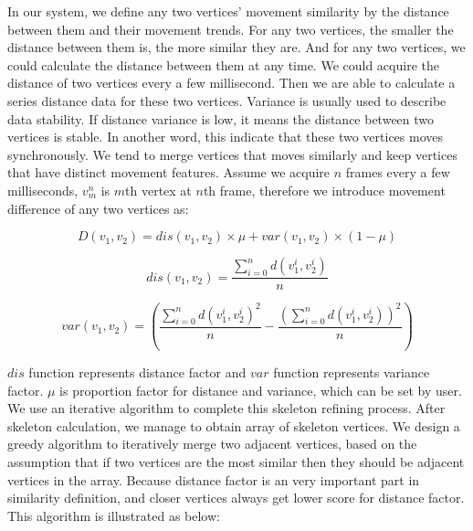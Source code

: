 \documentclass[10pt,journal,compsoc]{IEEEtran}
\begin{document}
In our system, we define any two vertices' movement similarity by the distance between them and their movement trends. For any two vertices, the smaller the distance between them is, the more similar they are. And for any two vertices, we could calculate the distance between them at any time. We could acquire the distance of two vertices every a few millisecond. Then we are able to calculate a series distance data for these two vertices. Variance is usually used to describe data stability. If distance variance is low, it means the distance between two vertices is stable. In another word, this indicate that these two vertices moves synchronously. We tend to merge vertices that moves similarly and keep vertices that have distinct movement features. Assume we acquire $n$ frames every a few milliseconds, $v_{m}^{n}$ is $m$th vertex at $n$th frame, therefore we introduce movement difference of any two vertices as:

\begin{equation}
D(v_{1}, v_{2}) = dis(v_{1}, v_{2})\times \mu + var(v_{1}, v_{2}) \times (1-\mu)
\label{eq:similarityeq}
\end{equation}

\begin{equation}
dis(v_{1}, v_{2}) = \dfrac{\sum_{i = 0}^{n}{d(v_{1}^{i}, v_{2}^{i})}}{n}
\label{eq:distance}
\end{equation}

\begin{equation}
var(v_{1}, v_{2}) = (\dfrac{\sum_{i = 0}^{n}{d(v_{1}^{i}, v_{2}^{i})}^{2}}{n} - \dfrac{(\sum_{i = 0}^{n}{d(v_{1}^{i}, v_{2}^{i})})^{2}}{n})
\label{eq:variance}
\end{equation}

$dis$ function represents distance factor and $var$ function represents variance factor. $\mu$ is proportion factor for distance and variance, which can be set by user.\\

We use an iterative algorithm to complete this skeleton refining process. After skeleton calculation, we manage to obtain array of skeleton vertices. We design a greedy algorithm to iteratively merge two adjacent vertices, based on the assumption that if two vertices are the most similar then they should be adjacent vertices in the array. Because distance factor is an very important part in similarity definition, and closer vertices always get lower score for distance factor. This algorithm is illustrated as below:

    \renewcommand{\algorithmicrequire}{\textbf{Input:}}
    \renewcommand{\algorithmicensure}{\textbf{Output:}}
\end{document}

